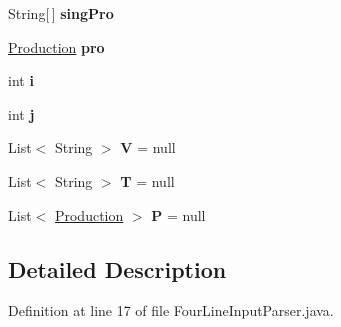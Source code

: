 \begin{DoxyCompactItemize}
\item 
\hypertarget{classinput_parser_1_1_four_line_input_parser_a7a3bb0e55f839ba984d0953724ea385a}{String\mbox{[}$\,$\mbox{]} {\bfseries sing\-Pro}}\label{classinput_parser_1_1_four_line_input_parser_a7a3bb0e55f839ba984d0953724ea385a}

\item 
\hypertarget{classinput_parser_1_1_four_line_input_parser_ae0f524894f39d7a13bddd5e2efad8d3e}{\hyperlink{classcontext_free_1_1grammar_1_1_production}{Production} {\bfseries pro}}\label{classinput_parser_1_1_four_line_input_parser_ae0f524894f39d7a13bddd5e2efad8d3e}

\item 
\hypertarget{classinput_parser_1_1_four_line_input_parser_a39fe356d1b2152557ca7c5d47b0d2f43}{int {\bfseries i}}\label{classinput_parser_1_1_four_line_input_parser_a39fe356d1b2152557ca7c5d47b0d2f43}

\item 
\hypertarget{classinput_parser_1_1_four_line_input_parser_a6aaf88a0bec2622e542a59b4efdd19b6}{int {\bfseries j}}\label{classinput_parser_1_1_four_line_input_parser_a6aaf88a0bec2622e542a59b4efdd19b6}

\item 
\hypertarget{classinput_parser_1_1_four_line_input_parser_a1dd8814f232e9c83f48ead8cf5d9f2b2}{List$<$ String $>$ {\bfseries V} = null}\label{classinput_parser_1_1_four_line_input_parser_a1dd8814f232e9c83f48ead8cf5d9f2b2}

\item 
\hypertarget{classinput_parser_1_1_four_line_input_parser_ac5810e00377c73d3218c6c517676c5d4}{List$<$ String $>$ {\bfseries T} = null}\label{classinput_parser_1_1_four_line_input_parser_ac5810e00377c73d3218c6c517676c5d4}

\item 
\hypertarget{classinput_parser_1_1_four_line_input_parser_a25cb1cc11bda9a906f0a29eb66444c76}{List$<$ \hyperlink{classcontext_free_1_1grammar_1_1_production}{Production} $>$ {\bfseries P} = null}\label{classinput_parser_1_1_four_line_input_parser_a25cb1cc11bda9a906f0a29eb66444c76}

\end{DoxyCompactItemize}


\subsection{Detailed Description}


Definition at line 17 of file Four\-Line\-Input\-Parser.\-java.



